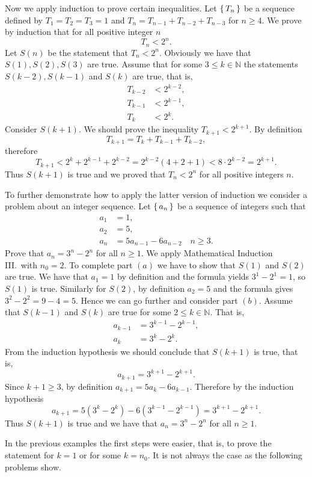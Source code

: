 Now we apply induction to prove certain inequalities. Let $\left\{\,T_n\,\right\}$ be a sequence defined by $T_1=T_2=T_3=1$ and $T_n=T_{n-1}+T_{n-2}+T_{n-3}$ for $n\geq 4$.
We prove by induction that for all positive integer $n$ 
$$
T_n<2^n.
$$
Let $S(n)$ be the statement that $T_n<2^n$. Obviously we have that $S(1),S(2),S(3)$ are true. Assume that for some $3\leq k\in\mathbb{N}$ the statements $S(k-2),S(k-1)$
and $S(k)$ are true, that is, 
\begin{align*}
T_{k-2}&<2^{k-2},\\
T_{k-1}&<2^{k-1},\\
T_{k}&<2^{k}.
\end{align*}
Consider $S(k+1)$. We should prove the inequality $T_{k+1}<2^{k+1}$. By definition 
$$
T_{k+1}=T_{k}+T_{k-1}+T_{k-2},
$$
therefore
$$
T_{k+1}<2^k+2^{k-1}+2^{k-2}=2^{k-2}(4+2+1)<8\cdot 2^{k-2}=2^{k+1}.
$$
Thus $S(k+1)$ is true and we proved that $T_n<2^n$ for all positive integers $n$.

To further demonstrate how to apply the latter version of induction we consider a problem about an integer sequence.
Let $\left\{\,a_n\,\right\}$ be a sequence of integers such that 
\begin{align*}
a_1&=1,\\
a_2&=5,\\
a_n&=5a_{n-1}-6a_{n-2}\quad n\geq 3.
\end{align*}
Prove that $a_n=3^n-2^n$ for all $n\geq 1$.
We apply Mathematical Induction III.\ with $n_0=2$. To complete part $(a)$ we have to show that $S(1)$ and $S(2)$
are true. We have that $a_1=1$ by definition and the formula yields $3^1-2^1=1$, so $S(1)$ is true. Similarly for $S(2)$,
by definition $a_2=5$ and the formula gives $3^2-2^2=9-4=5$. Hence we can go further and consider part $(b)$.
Assume that $S(k-1)$ and $S(k)$ are true for some $2\leq k\in\mathbb{N}$. That is, 
\begin{align*}
a_{k-1}&=3^{k-1}-2^{k-1},\\
a_k&=3^k-2^k.
\end{align*}
From the induction hypothesis we should conclude that $S(k+1)$ is true, that is, 
$$
a_{k+1}=3^{k+1}-2^{k+1}.
$$
Since $k+1\geq 3$, by definition $a_{k+1}=5a_{k}-6a_{k-1}$. Therefore by the induction hypothesis
$$
a_{k+1}=5(3^k-2^k)-6(3^{k-1}-2^{k-1})=3^{k+1}-2^{k+1}.
$$
Thus $S(k+1)$ is true and we have that $a_n=3^n-2^n$ for all $n\geq 1$.

In the previous examples the first steps were easier, that is, to prove the statement for $k=1$ or for some $k=n_0$.
It is not always the case as the following problems show.

